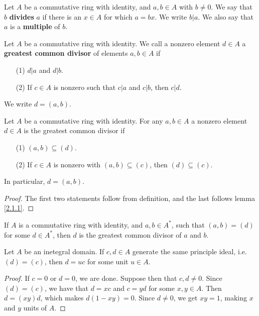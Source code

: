 \begin{definition}
    Let $A$ be a commutative ring with identity, and  $a,b \in A$ with $b \neq 0$.
    We say that $b$ \textbf{divides} $a$ if there is an  $x \in A$ for which  $a=bx$.
    We write  $b|a$. We also say that $a$ is a \textbf{multiple} of $b$.
\end{definition}

\begin{definition}
    Let $A$ be a commutative ring with identity. We call a nonzero element
    $d \in A$ a \textbf{greatest common divisor} of elements $a,b \in A$ if
    \begin{enumerate}
        \item[(1)] $d|a$ and  $d|b$.

        \item[(2)] If $c \in A$ is nonzero such that  $c|a$ and  $c|b$, then
            $c|d$.
    \end{enumerate}
    We write $d=(a,b)$.
\end{definition}

\begin{lemma}\label{2.1.2}
    Let $A$ be a commutative ring with identity. For any $a,b \in A$ a nonzero
    element $d \in A$ is the greatest common divisor if
    \begin{enumerate}
        \item[(1)] $(a,b) \subseteq (d)$.

        \item[(2)] If $c \in A$ is nonzero with $(a,b) \subseteq (c)$, then $(d)
            \subseteq (c)$.
    \end{enumerate}
    In particular, $d=(a,b)$.
\end{lemma}
\begin{proof}
    The first two statements follow from definition, and the last follows lemma
    \ref{2.1.1}.
\end{proof}

\begin{lemma}\label{2.1.3}
    If $A$ is a commutative ring with identity, and $a,b \in A^\ast$, such that
    $(a,b)=(d)$ for some $d \in A^\ast$, then $d$ is the greatest common divisor
    of $a$ and $b$.
\end{lemma}

\begin{lemma}\label{2.1.4}
    Let $A$ be an inetegral domain. If $c,d \in A$ generate the same principle
    ideal, i.e. $(d)=(c)$, then $d=uc$ for some unit  $u \in A$.
\end{lemma}
\begin{proof}
    If $c=0$ or  $d=0$, we are done. Suppose then that  $c,d \neq 0$. Since
    $(d)=(c)$, we have that $d=xc$ and $c=yd$ for some  $x,y \in A$. Then
    $d=(xy)d$, which makes $d(1-xy)=0$. Since $d \neq 0$, we get $xy=1$, making
     $x$ and $y$ units of $A$.
\end{proof}

